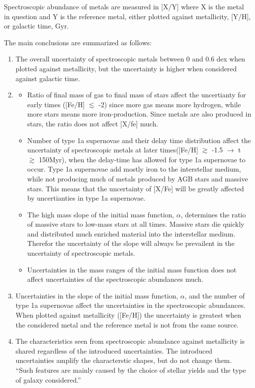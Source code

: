 Spectroscopic abundance of metals are measured in [X/Y] where X is the metal in question and Y is the reference metal, either plotted against metallicity, [Y/H], or galactic time, Gyr.

The main conclusions are summarized as follows:
\begin{enumerate}
\item{
  The overall uncertainty of spectroscopic metals between 0 and 0.6 dex when plotted against metallicity, but the uncertainty is higher when considered against galactic time.}
\item{
  \begin{itemize}
  \item{Ratio of final mass of gas to final mass of stars affect the uncertianty for early times ([Fe/H] $\lesssim$ -2) since more gas means more hydrogen, while more stars means more iron-production. Since metals are also produced in stars, the ratio does not affect [X/fe] much.}
  \item{Number of type 1a supernovae and their delay time distribution affect the uncertainty of spectroscopic metals at later times([Fe/H] $\gtrsim$ -1.5 $\rightarrow$ t $\gtrsim$ 150Myr), when the delay-time has allowed for type 1a supernovae to occur. Type 1a supernovae add mostly iron to the interstellar medium, while not producing much of metals produced by AGB stars and massive stars. This means that the uncertainty of [X/Fe] will be greatly affected by uncertianties in type 1a supernovae.}
  \item{The high mass slope of the initial mass function, $\alpha$, determines the ratio of massive stars to low-mass stars at all times. Massive stars die quickly and distributed much enriched material into the interstellar medium. Therefor the uncertainty of the slope will always be prevailent in the uncertainty of spectroscopic metals.}
  \item{Uncertainties in the mass ranges of the initial mass function does not affect uncertainties of the spectroscopic abundances much.}
  \end{itemize}
}
\item{
  Uncertainties in the slope of the initial mass function, $\alpha$, and the number of type 1a supernovae affect the uncertainties in the spectroscopic abundances.
  When plotted against metallicity ([Fe/H]) the uncertainty is greatest when the considered metal and the reference metal is not from the same source.
}
\item{
  The characteristics seen from spectroscopic abundance against metallicity is shared regardless of the introduced uncertainties.
  The introduced uncertainties amplify the characterstic shapes, but do not change them. ``Such features are mainly caused by the choice of stellar yields and the type of galaxy considered.''
}
\end{enumerate}

